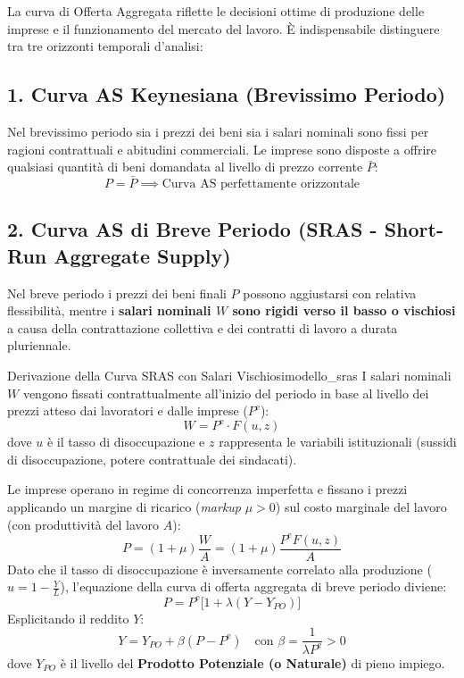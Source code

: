 La curva di Offerta Aggregata riflette le decisioni ottime di produzione delle imprese e il funzionamento del mercato del lavoro. È indispensabile distinguere tra tre orizzonti temporali d'analisi:

\subsection{1. Curva AS Keynesiana (Brevissimo Periodo)}
Nel brevissimo periodo sia i prezzi dei beni sia i salari nominali sono fissi per ragioni contrattuali e abitudini commerciali. Le imprese sono disposte a offrire qualsiasi quantità di beni domandata al livello di prezzo corrente $\bar{P}$:
\begin{equation}
    P = \bar{P} \implies \text{Curva AS perfettamente orizzontale}
\end{equation}

\subsection{2. Curva AS di Breve Periodo (SRAS - Short-Run Aggregate Supply)}
Nel breve periodo i prezzi dei beni finali $P$ possono aggiustarsi con relativa flessibilità, mentre i \textbf{salari nominali $W$ sono rigidi verso il basso o vischiosi} a causa della contrattazione collettiva e dei contratti di lavoro a durata pluriennale.

\begin{modello}{Derivazione della Curva SRAS con Salari Vischiosi}{modello_sras}
I salari nominali $W$ vengono fissati contrattualmente all'inizio del periodo in base al livello dei prezzi atteso dai lavoratori e dalle imprese ($P^{\mathrm{e}}$):
\begin{equation}
    W = P^{\mathrm{e}} \cdot F(u, z)
\end{equation}
dove $u$ è il tasso di disoccupazione e $z$ rappresenta le variabili istituzionali (sussidi di disoccupazione, potere contrattuale dei sindacati).

Le imprese operano in regime di concorrenza imperfetta e fissano i prezzi applicando un margine di ricarico (\textit{markup} $\mu > 0$) sul costo marginale del lavoro (con produttività del lavoro $A$):
\begin{equation}
    P = (1 + \mu) \frac{W}{A} = (1 + \mu) \frac{P^{\mathrm{e}} F(u, z)}{A}
\end{equation}
Dato che il tasso di disoccupazione è inversamente correlato alla produzione ($u = 1 - \frac{Y}{L}$), l'equazione della curva di offerta aggregata di breve periodo diviene:
\begin{equation}
    P = P^{\mathrm{e}} \Big[ 1 + \lambda (Y - Y_{PO}) \Big] \label{eq:sras_prezzo}
\end{equation}
Esplicitando il reddito $Y$:
\begin{equation}
    Y = Y_{PO} + \beta (P - P^{\mathrm{e}}) \quad \text{con } \beta = \frac{1}{\lambda P^{\mathrm{e}}} > 0 \label{eq:sras_produzione}
\end{equation}
dove $Y_{PO}$ è il livello del \textbf{Prodotto Potenziale (o Naturale)} di pieno impiego.
\end{modello}

